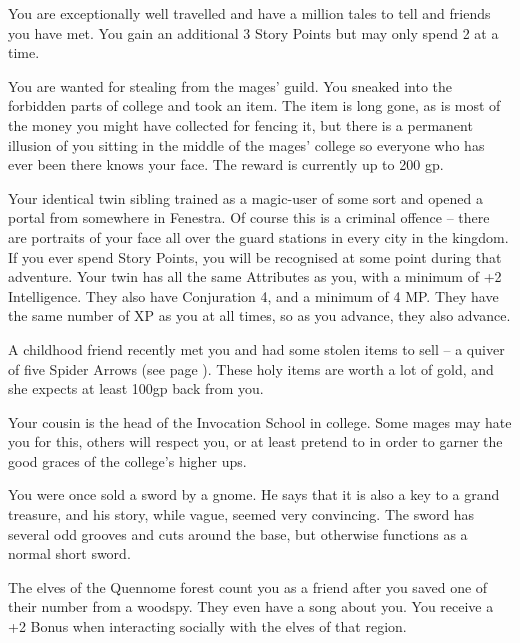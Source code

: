 \begin{multicols}{2}
\begin{list}{\addtocounter{list}{1}\textbf{:}}{\raggedleft}
	\item{You are exceptionally well travelled and have a million tales to tell and friends you have met.  You gain an additional 3 Story Points but may only spend 2 at a time. }

	\item{You are wanted for stealing from the mages' guild.
You sneaked into the forbidden parts of \gls{college} and took an item.
The item is long gone, as is most of the money you might have collected for fencing it, but there is a permanent illusion of you sitting in the middle of the mages' \gls{college} so everyone who has ever been there knows your face.
The reward is currently up to 200 gp.}

	\item{Your identical twin sibling trained as a magic-user of some sort and opened a portal from somewhere in Fenestra.
	Of course this is a criminal offence -- there are portraits of your face all over the guard stations in every city in the kingdom.
	If you ever spend Story Points, you will be recognised at some point during that adventure.
	Your twin has all the same Attributes as you, with a minimum of +2 Intelligence.
	They also have Conjuration 4, and a minimum of 4 MP.
	They have the same number of XP as you at all times, so as you advance, they also advance.
}

	\item{A childhood friend recently met you and had some stolen items to sell -- a quiver of five Spider Arrows (see page \pageref{spiderarrows}).
These holy items are worth a lot of gold, and she expects at least 100gp back from you.}

	\item{Your cousin is the head of the Invocation School in \gls{college}. Some mages may hate you for this, others will respect you, or at least pretend to in order to garner the good graces of the \gls{college}'s higher ups.}

	\item{You were once sold a sword by a gnome.  He says that it is also a key to a grand treasure, and his story, while vague, seemed very convincing.  The sword has several odd grooves and cuts around the base, but otherwise functions as a normal short sword. }

	\item{The elves of the Quennome forest count you as a friend after you saved one of their number from a woodspy.  They even have a song about you. You receive a +2 Bonus when interacting socially with the elves of that region.}


\end{list}
\end{multicols}
